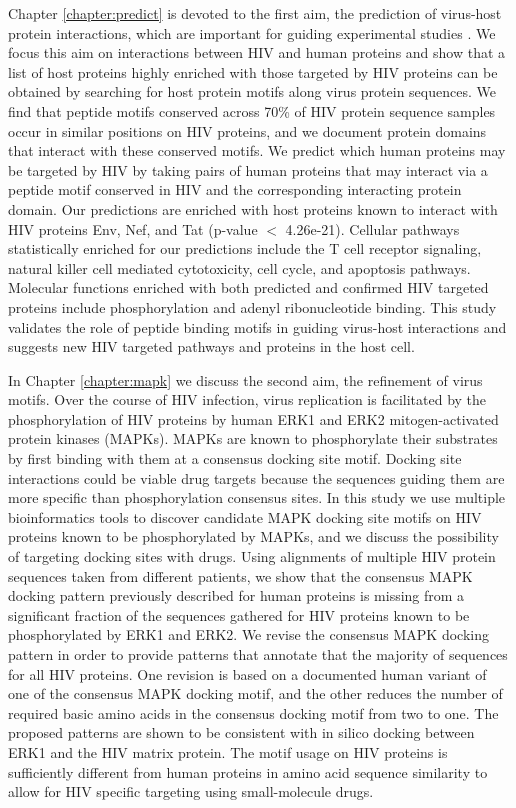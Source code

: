 Chapter \ref{chapter:predict} is devoted to the first aim, the
prediction of virus-host protein interactions, which are important for
guiding experimental studies
\cite{jansen2003bayesian,lee2004probabilistic}. We focus this aim on
interactions between HIV and human proteins and show that a list of
host proteins highly enriched with those targeted by HIV proteins can
be obtained by searching for host protein motifs along virus protein
sequences. We find that peptide motifs conserved across 70\% of HIV
protein sequence samples occur in similar positions on HIV proteins,
and we document protein domains that interact with these conserved
motifs. We predict which human proteins may be targeted by HIV by
taking pairs of human proteins that may interact via a peptide motif
conserved in HIV and the corresponding interacting protein domain. Our
predictions are enriched with host proteins known to interact with HIV
proteins Env, Nef, and Tat (p-value $<$ 4.26e-21). Cellular pathways
statistically enriched for our predictions include the T cell receptor
signaling, natural killer cell mediated cytotoxicity, cell cycle, and
apoptosis pathways. Molecular functions enriched with both predicted
and confirmed HIV targeted proteins include phosphorylation and adenyl
ribonucleotide binding. This study validates the role of peptide
binding motifs in guiding virus-host interactions and suggests new HIV
targeted pathways and proteins in the host cell.

In Chapter \ref{chapter:mapk} we discuss the second aim, the
refinement of virus motifs. Over the course of HIV infection, virus
replication is facilitated by the phosphorylation of HIV proteins by
human ERK1 and ERK2 mitogen-activated protein kinases (MAPKs). MAPKs
are known to phosphorylate their substrates by first binding with them
at a consensus docking site motif. Docking site interactions could be
viable drug targets because the sequences guiding them are more
specific than phosphorylation consensus sites. In this study we use
multiple bioinformatics tools to discover candidate MAPK docking site
motifs on HIV proteins known to be phosphorylated by MAPKs, and we
discuss the possibility of targeting docking sites with drugs. Using
alignments of multiple HIV protein sequences taken from different
patients, we show that the consensus MAPK docking pattern previously
described for human proteins is missing from a significant fraction of
the sequences gathered for HIV proteins known to be phosphorylated by
ERK1 and ERK2. We revise the consensus MAPK docking pattern in order
to provide patterns that annotate that the majority of sequences for
all HIV proteins. One revision is based on a documented human variant
of one of the consensus MAPK docking motif, and the other reduces the
number of required basic amino acids in the consensus docking motif
from two to one. The proposed patterns are shown to be consistent with
in silico docking between ERK1 and the HIV matrix protein. The motif
usage on HIV proteins is sufficiently different from human proteins in
amino acid sequence similarity to allow for HIV specific targeting
using small-molecule drugs. 

